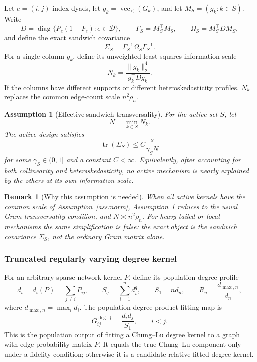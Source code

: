\documentclass[12pt]{article}
\newtheorem{remark}{Remark}
\newtheorem{assumption}{Assumption}
\newcommand{\1}{\mathbf{1}}
\begin{document}
Let \(e=(i,j)\) index dyads, let \(g_k=\operatorname{vec}_{<}(G_k)\), and let
\(M_S=(g_k:k\in S)\). Write
\[
    D=\operatorname{diag}\{P_e(1-P_e):e\in \mathcal D\},
    \qquad
    \Gamma_S=M_S^\top M_S,
    \qquad
    \Omega_S=M_S^\top D M_S,
\]
and define the exact sandwich covariance
\[
    \Sigma_S=\Gamma_S^{-1}\Omega_S\Gamma_S^{-1}.
\]
For a single column \(g_k\), define its unweighted least-squares information
scale
\[
    N_k
    =
    \frac{\|g_k\|_2^4}{g_k^\top D g_k}.
\]
If the columns have different supports or different heteroskedasticity
profiles, \(N_k\) replaces the common edge-count scale \(n^2\rho_n\).

\begin{assumption}[Effective sandwich transversality]
\label{ass:effective-sandwich}
For the active set \(S\), let
\[
    N=\min_{k\in S}N_k.
\]
The active design satisfies
\[
    \operatorname{tr}(\Sigma_S)
    \le
    C\frac{s}{\gamma_S N}
\]
for some \(\gamma_S\in(0,1]\) and a constant \(C<\infty\).
Equivalently, after accounting for both collinearity and heteroskedasticity,
no active mechanism is nearly explained by the others at its own information
scale.
\end{assumption}

\begin{remark}[Why this assumption is needed]
When all active kernels have the common scale of Assumption~\ref{ass:norm},
Assumption~\ref{ass:effective-sandwich} reduces to the usual Gram
transversality condition, and \(N\asymp n^2\rho_n\). For heavy-tailed
or local mechanisms the same simplification is false: the exact object is the
sandwich covariance \(\Sigma_S\), not the ordinary Gram matrix alone.
\end{remark}

\subsubsection{Truncated regularly varying degree kernel}

For an arbitrary sparse network kernel \(P\), define its population degree
profile
\[
    d_i=d_i(P)=\sum_{j\ne i}P_{ij},
    \qquad
    S_q=\sum_{i=1}^n d_i^q,
    \qquad
    S_1=n\bar d_n,
    \qquad
    R_n=\frac{d_{\max,n}}{\bar d_n},
\]
where \(d_{\max,n}=\max_i d_i\). The population degree-product fitting map is
\[
    G^{\deg,\dagger}_{ij}
    =
    \frac{d_i d_j}{S_1},
    \qquad i<j.
\]
This is the population output of fitting a Chung--Lu degree kernel to a graph
with edge-probability matrix \(P\). It equals the true Chung--Lu component
only under a fidelity condition; otherwise it is a candidate-relative fitted
degree kernel.
\end{document}
